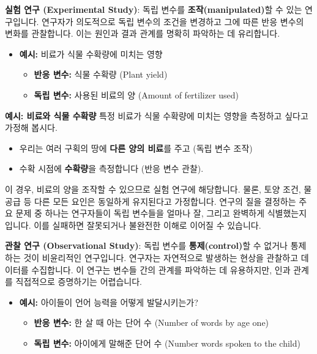 \documentclass[11pt,a4paper]{book}
\newcommand{\concept}[1]{\textbf{#1}}
\theoremstyle{definition}
\begin{document}
\begin{tcolorbox}[infobox, title={연구의 유형 (1/2): 실험 연구 (Experimental Study)}]
\concept{실험 연구 (Experimental Study)}: 독립 변수를 \textbf{조작(manipulated)}할 수 있는 연구입니다. 연구자가 의도적으로 독립 변수의 조건을 변경하고 그에 따른 반응 변수의 변화를 관찰합니다. 이는 원인과 결과 관계를 명확히 파악하는 데 유리합니다.
\begin{itemize}
    \item \textbf{예시:} 비료가 식물 수확량에 미치는 영향
    \begin{itemize}
        \item \textbf{반응 변수:} 식물 수확량 (Plant yield)
        \item \textbf{독립 변수:} 사용된 비료의 양 (Amount of fertilizer used)
    \end{itemize}
\end{itemize}
\end{tcolorbox}

\begin{examplebox}
\textbf{예시: 비료와 식물 수확량}
특정 비료가 식물 수확량에 미치는 영향을 측정하고 싶다고 가정해 봅시다.
\begin{itemize}
    \item 우리는 여러 구획의 땅에 \textbf{다른 양의 비료}를 주고 (독립 변수 조작)
    \item 수확 시점에 \textbf{수확량}을 측정합니다 (반응 변수 관찰).
\end{itemize}
이 경우, 비료의 양을 조작할 수 있으므로 실험 연구에 해당합니다. 물론, 토양 조건, 물 공급 등 다른 모든 요인은 동일하게 유지된다고 가정합니다. 연구의 질을 결정하는 주요 문제 중 하나는 연구자들이 독립 변수들을 얼마나 잘, 그리고 완벽하게 식별했는지입니다. 이를 실패하면 잘못되거나 불완전한 이해로 이어질 수 있습니다.
\end{examplebox}

\begin{tcolorbox}[infobox, title={연구의 유형 (2/2): 관찰 연구 (Observational Study)}]
\concept{관찰 연구 (Observational Study)}: 독립 변수를 \textbf{통제(control)}할 수 없거나 통제하는 것이 비윤리적인 연구입니다. 연구자는 자연적으로 발생하는 현상을 관찰하고 데이터를 수집합니다. 이 연구는 변수들 간의 관계를 파악하는 데 유용하지만, 인과 관계를 직접적으로 증명하기는 어렵습니다.
\begin{itemize}
    \item \textbf{예시:} 아이들이 언어 능력을 어떻게 발달시키는가?
    \begin{itemize}
        \item \textbf{반응 변수:} 한 살 때 아는 단어 수 (Number of words by age one)
        \item \textbf{독립 변수:} 아이에게 말해준 단어 수 (Number words spoken to the child)
    \end{itemize}
\end{itemize}
\end{tcolorbox}
\end{document}
